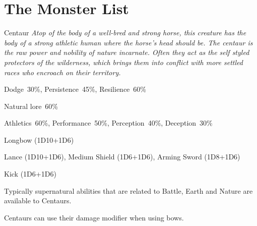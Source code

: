 \section{The Monster List}

\begin{monsterbox}{Centaur}
	\textit{Atop of the body of a well-bred and strong horse, this creature has the body of a strong athletic human where the horse’s head should be. The centaur is the raw power and nobility of nature incarnate. Often they act as the self styled protectors of the wilderness, which brings them into conflict with more settled races who encroach on their territory.}\\
	\rpghline
	\basics[%
        hitpoints  = 19, %
	majorwound = 10,
	damagemodifier = +1D6,
	powerpoints = 11,
	movementrate = 23m,
	armor = Leather (2AP),
	plunderrating = 2
	]
	\rpghline%
	\stats[ %
		STR = 3D6+6 (17),
		CON = 3D6   (11),
		DEX = 3D6+3 (14),
		SIZ = 4D6+12 (26),
		INT = 2D6+6 (13),
		POW = 3D6   (11),
		CHA = 3D6   (11)
	]
	\rpghline%
	\begin{rpg-monsteraction}[Resistances]
		Dodge~30\%, Persistence~45\%, Resilience~60\%
	\end{rpg-monsteraction}
	\begin{rpg-monsteraction}[Knowledge]
    		Natural lore~60\%
	\end{rpg-monsteraction}
	\begin{rpg-monsteraction}[Practical]
		Athletics~60\%, Performance~50\%, Perception~40\%, Deception~30\%
	\end{rpg-monsteraction}
	\begin{rpg-monsteraction}
		Longbow (1D10+1D6)
	\end{rpg-monsteraction}
	\begin{rpg-monsteraction}
		Lance (1D10+1D6), Medium Shield (1D6+1D6), Arming Sword (1D8+1D6)
	\end{rpg-monsteraction}
	\begin{rpg-monsteraction}
		Kick (1D6+1D6)
	\end{rpg-monsteraction}
	\begin{rpg-monsteraction}[Supernatural]
		Typically supernatural abilities that are related to Battle, Earth and Nature are available to Centaurs.
	\end{rpg-monsteraction}
	\begin{rpg-monsteraction}
		Centaurs can use their damage modifier when using bows.
	\end{rpg-monsteraction}

\end{monsterbox}

